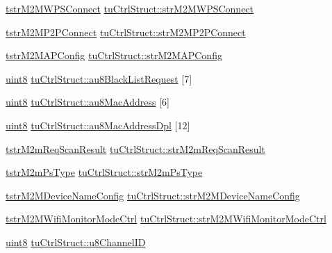 \begin{DoxyCompactItemize}
\hyperlink{structtstrM2MWPSConnect}{tstr\+M2\+M\+W\+P\+S\+Connect} \hyperlink{group__WifiSetCustInfoElementFn_gab96b5d47666de98ab9d1a853e51f8187}{tu\+Ctrl\+Struct\+::str\+M2\+M\+W\+P\+S\+Connect}
\item 
\hyperlink{structtstrM2MP2PConnect}{tstr\+M2\+M\+P2\+P\+Connect} \hyperlink{group__WifiSetCustInfoElementFn_gab580a9212d8a2f15fbe45ec23645a7f8}{tu\+Ctrl\+Struct\+::str\+M2\+M\+P2\+P\+Connect}
\item 
\hyperlink{structtstrM2MAPConfig}{tstr\+M2\+M\+A\+P\+Config} \hyperlink{group__WifiSetCustInfoElementFn_ga33900b8a4558ea4ad0db0fa2d11482c3}{tu\+Ctrl\+Struct\+::str\+M2\+M\+A\+P\+Config}
\item 
\hyperlink{group__DataT_ga4df709a77647e870bbf1d955b8edc9a6}{uint8} \hyperlink{group__WifiSetCustInfoElementFn_ga6f70ecd991f703463e35811a52a44b8d}{tu\+Ctrl\+Struct\+::au8\+Black\+List\+Request} \mbox{[}7\mbox{]}
\item 
\hyperlink{group__DataT_ga4df709a77647e870bbf1d955b8edc9a6}{uint8} \hyperlink{group__WifiSetCustInfoElementFn_ga7c52de645efc2da332e16b2bae901a3f}{tu\+Ctrl\+Struct\+::au8\+Mac\+Address} \mbox{[}6\mbox{]}
\item 
\hyperlink{group__DataT_ga4df709a77647e870bbf1d955b8edc9a6}{uint8} \hyperlink{group__WifiSetCustInfoElementFn_ga1c8c88a24f0435e3d207b68cc9ed4a90}{tu\+Ctrl\+Struct\+::au8\+Mac\+Address\+Dpl} \mbox{[}12\mbox{]}
\item 
\hyperlink{structtstrM2mReqScanResult}{tstr\+M2m\+Req\+Scan\+Result} \hyperlink{group__WifiSetCustInfoElementFn_ga7c762ccb0b8c6e59683112c64d5162a0}{tu\+Ctrl\+Struct\+::str\+M2m\+Req\+Scan\+Result}
\item 
\hyperlink{structtstrM2mPsType}{tstr\+M2m\+Ps\+Type} \hyperlink{group__WifiSetCustInfoElementFn_ga7f6c06c6585ff28e2e0cfc9d19eab533}{tu\+Ctrl\+Struct\+::str\+M2m\+Ps\+Type}
\item 
\hyperlink{structtstrM2MDeviceNameConfig}{tstr\+M2\+M\+Device\+Name\+Config} \hyperlink{group__WifiSetCustInfoElementFn_ga9608ef3bf6a4e7bf67c95d25a1540ec5}{tu\+Ctrl\+Struct\+::str\+M2\+M\+Device\+Name\+Config}
\item 
\hyperlink{structtstrM2MWifiMonitorModeCtrl}{tstr\+M2\+M\+Wifi\+Monitor\+Mode\+Ctrl} \hyperlink{group__WifiSetCustInfoElementFn_ga68ebf8eb543fabfdf0021e6ba8fcb568}{tu\+Ctrl\+Struct\+::str\+M2\+M\+Wifi\+Monitor\+Mode\+Ctrl}
\item 
\hyperlink{group__DataT_ga4df709a77647e870bbf1d955b8edc9a6}{uint8} \hyperlink{group__WifiSetCustInfoElementFn_gacafdeb10d6414675b5e85687a9392ebc}{tu\+Ctrl\+Struct\+::u8\+Channel\+ID}

\end{DoxyCompactItemize}
